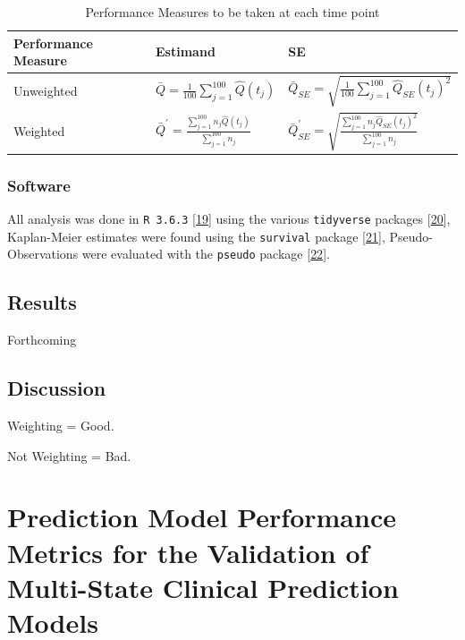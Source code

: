 \documentclass[12pt,PhD,twoside,openright]{muthesis}
\begin{document}
\begin{table}

\caption{\label{tab:PM-DGM}{\small Performance Measures to be taken at each time point}}
\centering
\fontsize{7}{9}\selectfont
\begin{tabular}[t]{lll}
\toprule
Performance Measure & Estimand & SE\\
\midrule
\rowcolor{gray!6}  Unweighted & $\bar{Q}=\frac{1}{100}\sum_{j=1}^{100}\hat{Q}(t_j)$ & $\bar{Q}_{SE}=\sqrt{\frac{1}{100}\sum_{j=1}^{100} \hat{Q}_{SE}(t_j)^2 }$\\
Weighted & $\bar{Q}^{\prime}=\frac{\sum_{j=1}^{100}n_j\hat{Q}(t_j) }{\sum_{j=1}^{100}n_j}$ & $\bar{Q}^{\prime}_{SE} = \sqrt{\frac{\sum_{j=1}^{100} n_j \hat{Q}_{SE}(t_j)^2 }{\sum_{j=1}^{100}n_j}}$\\
\bottomrule
\end{tabular}
\end{table}
\hypertarget{software}{%
\subsection{Software}\label{software}}

All analysis was done in \texttt{R\ 3.6.3} {[}\protect\hyperlink{ref-r_core_team_r_nodate}{19}{]} using the various \texttt{tidyverse} packages {[}\protect\hyperlink{ref-wickham_tidy_2017}{20}{]}, Kaplan-Meier estimates were found using the \texttt{survival} package {[}\protect\hyperlink{ref-therneau_package_2020}{21}{]}, Pseudo-Observations were evaluated with the \texttt{pseudo} package {[}\protect\hyperlink{ref-perme_pseudo_2017}{22}{]}.

\hypertarget{results-3}{%
\section{Results}\label{results-3}}

Forthcoming

\hypertarget{discussion-2}{%
\section{Discussion}\label{discussion-2}}

Weighting = Good.

Not Weighting = Bad.

\hypertarget{chap-performance-metrics}{%
\chapter{Prediction Model Performance Metrics for the Validation of Multi-State Clinical Prediction Models}\label{chap-performance-metrics}}
\end{document}
